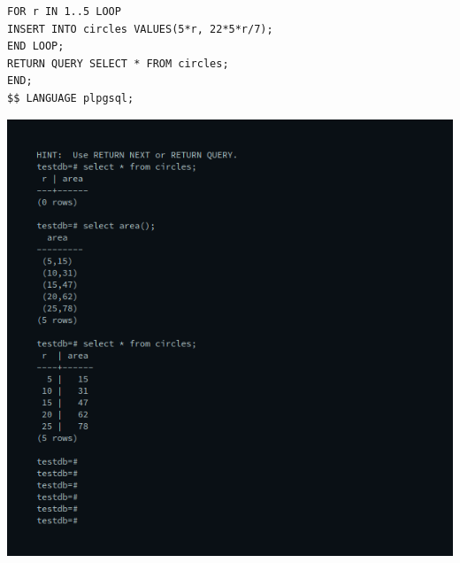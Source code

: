 \begin{enumerate}
\begin{verbatim}
FOR r IN 1..5 LOOP
INSERT INTO circles VALUES(5*r, 22*5*r/7);
END LOOP;
RETURN QUERY SELECT * FROM circles;
END;
$$ LANGUAGE plpgsql;
\end{verbatim}
\newline
\includegraphics[width=\linewidth]{../Images/Plsql/4.png}


\end{enumerate}
